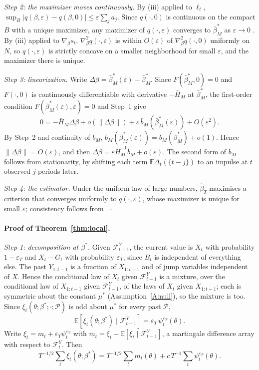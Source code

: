 \documentclass[11pt,a4paper]{article}
\theoremstyle{definition}
\theoremstyle{remark}
\newcommand{\E}{\mathbb{E}}
\newcommand{\F}{\mathcal{F}}
\begin{document}
\emph{Step 2: the maximizer moves continuously.} By (iii) applied to $\ell_t$, $\sup_B|q(\beta,\varepsilon)-q(\beta,0)|\le\varepsilon\sum_ja_j$. Since $q(\cdot,0)$ is continuous on the compact $B$ with a unique maximizer, any maximizer of $q(\cdot,\varepsilon)$ converges to $\bar\beta^*_M$ as $\varepsilon\to0$ \citep[Theorem~2.1]{newey1994}. By (iii) applied to $\nabla_\beta s_t$, $\nabla^2_\beta q(\cdot,\varepsilon)$ is within $O(\varepsilon)$ of $\nabla^2_\beta q(\cdot,0)$ uniformly on $N$, so $q(\cdot,\varepsilon)$ is strictly concave on a smaller neighborhood for small $\varepsilon$, and the maximizer there is unique.

\emph{Step 3: linearization.} Write $\Delta\beta=\bar\beta^*_M(\varepsilon)-\bar\beta^*_M$. Since $F(\bar\beta^*_M,0)=0$ and $F(\cdot,0)$ is continuously differentiable with derivative $-\bar H_M$ at $\bar\beta^*_M$, the first-order condition $F(\bar\beta^*_M(\varepsilon),\varepsilon)=0$ and Step~1 give
\[
0=-\bar H_M\Delta\beta+o(\|\Delta\beta\|)+\varepsilon\,\bar b_M(\bar\beta^*_M(\varepsilon))+O(\varepsilon^2).
\]
By Step~2 and continuity of $\bar b_M$, $\bar b_M(\bar\beta^*_M(\varepsilon))=\bar b_M(\bar\beta^*_M)+o(1)$. Hence $\|\Delta\beta\|=O(\varepsilon)$, and then $\Delta\beta=\varepsilon\bar H_M^{-1}\bar b_M+o(\varepsilon)$. The second form of $\bar b_M$ follows from stationarity, by shifting each term $\E\Delta_t(\{t-j\})$ to an impulse at $t$ observed $j$ periods later.

\emph{Step 4: the estimator.} Under the uniform law of large numbers, $\hat\beta_T$ maximises a criterion that converges uniformly to $q(\cdot,\varepsilon)$, whose maximizer is unique for small $\varepsilon$; consistency follows from \citet[Theorem~2.1]{newey1994}.
\hfill$\square$

\paragraph{Proof of Theorem~\ref{thm:local}.}

\emph{Step 1: decomposition at $\beta^*$.} Given $\F^Y_{t-1}$, the current value is $X_t$ with probability $1-\varepsilon_T$ and $X_t-G_t$ with probability $\varepsilon_T$, since $B_t$ is independent of everything else. The past $Y_{1:t-1}$ is a function of $X_{1:t-1}$ and of jump variables independent of $X$. Hence the conditional law of $X_t$ given $\F^Y_{t-1}$ is a mixture, over the conditional law of $X_{1:t-1}$ given $\F^Y_{t-1}$, of the laws of $X_t$ given $X_{1:t-1}$; each is symmetric about the constant $\mu^*$ (Assumption~\ref{A:null}), so the mixture is too. Since $\xi_t(\theta;\beta^*;\cdot;\mathcal P)$ is odd about $\mu^*$ for every past $\mathcal P$,
\[
\E[\xi_t(\theta;\beta^*)\mid\F^Y_{t-1}]=\varepsilon_T\,\psi^{\varepsilon_T}_t(\theta).
\]
Write $\xi_t=m_t+\varepsilon_T\psi^{\varepsilon_T}_t$ with $m_t=\xi_t-\E[\xi_t\mid\F^Y_{t-1}]$, a martingale difference array with respect to $\F^Y_t$. Then
\[
T^{-1/2}\sum_t\xi_t(\theta;\beta^*)=T^{-1/2}\sum_tm_t(\theta)+c\,T^{-1}\sum_t\psi^{\varepsilon_T}_t(\theta).
\]
\end{document}
